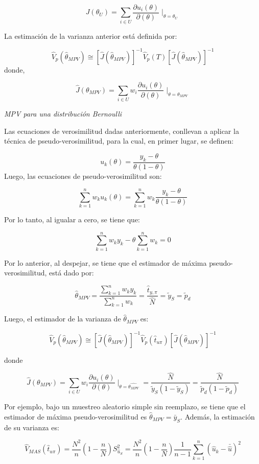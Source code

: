\documentclass[
  spanish,
  12pt,
]{book}
\begin{document}
\[
J(\theta_{U})=\sum_{i\in U}\dfrac{\partial u_{i}(\theta)}{\partial(\theta)}\mid_{\theta=\theta_{U}}
\]

La estimación de la varianza anterior está definida por:

\[
\hat{V}_{p}(\hat{\theta}_{MPV})\cong[\hat{J}(\hat{\theta}_{MPV})]^{-1}\hat{V}_{p}(T)[\hat{J}(\hat{\theta}_{MPV})]^{-1}
\]
donde,

\[
\hat{J}(\theta_{MPV})=\sum_{i\in U}w_{i}\dfrac{\partial u_{i}(\theta)}{\partial(\theta)}\mid_{\theta=\theta_{MPV}}
\]

\emph{MPV para una distribución Bernoulli}

Las ecuaciones de verosimilitud dadas anteriormente, conllevan a aplicar la técnica de pseudo-verosimilitud, para la cual, en primer lugar, se definen:

\[
u_{k}(\theta)=\frac{y_{k}-\theta}{\theta(1-\theta)}
\]
Luego, las ecuaciones de pseudo-verosimilitud son:

\[
\sum_{k=1}^{n}w_{k}u_{k}(\theta)=\sum_{k=1}^{n}w_{k}\frac{y_{k}-\theta}{\theta(1-\theta)}
\]

Por lo tanto, al igualar a cero, se tiene que:

\[
\sum_{k=1}^{n}w_{k}y_{k}-\theta\sum_{k=1}^{n}w_{k}=0
\]

Por lo anterior, al despejar, se tiene que el estimador de máxima pseudo-verosimilitud, está dado por:

\[
\hat{\theta}_{MPV}=\frac{\sum_{k=1}^{n}w_{k}y_{k}}{\sum_{k=1}^{n}w_{k}}=\frac{\hat{t}_{y,\pi}}{\hat{N}}=\tilde{y}_{S}=\tilde{p}_{d}
\]

Luego, el estimador de la varianza de \(\hat{\theta}_{MPV}\) es:

\[
\hat{V}_{p}(\hat{\theta}_{MPV})\cong[\hat{J}(\hat{\theta}_{MPV})]^{-1}\hat{V}_{p}(\hat{t}_{u\pi})[\hat{J}(\hat{\theta}_{MPV})]^{-1}
\]

donde

\[
\hat{J}(\theta_{MPV})=\sum_{i\in U}w_{i}\dfrac{\partial u_{i}(\theta)}{\partial(\theta)}\mid_{\theta=\hat{\theta_{MPV}}}=\frac{\hat{N}}{\tilde{y}_{S}(1-\tilde{y}_{S})}=\frac{\hat{N}}{\tilde{p}_{d}(1-\tilde{p}_{d})}
\]

Por ejemplo, bajo un muestreo aleatorio simple sin reemplazo, se tiene que el estimador de máxima pseudo-verosimilitud es \(\hat{\theta}_{MPV}=\bar{y}_{S}\). Además, la estimación de su varianza es:

\[
\hat{V}_{MAS}(\hat{t}_{u\pi})=\frac{N^{2}}{n}\left(1-\frac{n}{N}\right)S_{\hat{u}_{S}}^{2}=\frac{N^{2}}{n}\left(1-\frac{n}{N}\right)\frac{1}{n-1}\sum_{k=1}^{n}(\hat{u}_{k}-\bar{\hat{u}})^{2}
\]
\end{document}
